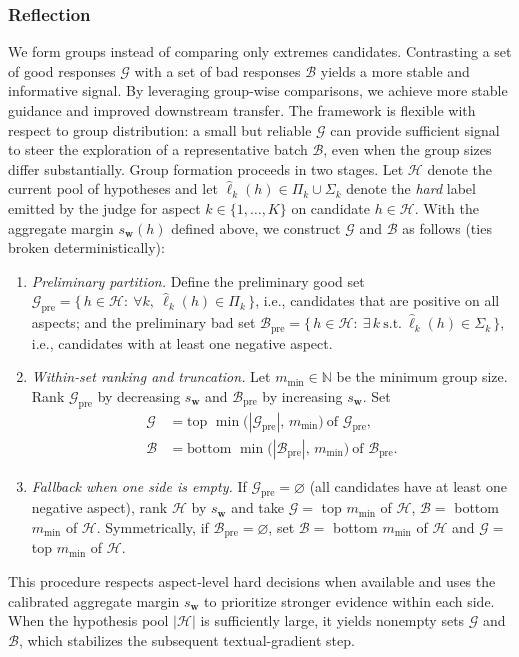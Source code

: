 \documentclass[11pt]{article}
\theoremstyle{plain}
\theoremstyle{definition}
\theoremstyle{remark}
\begin{document}
\subsubsection{Reflection}
We form groups instead of comparing only extremes candidates. Contrasting a set of good responses \(\mathcal{G}\) with a set of bad responses \(\mathcal{B}\) yields a more stable and informative signal. By leveraging group-wise comparisons, we achieve more stable guidance and improved downstream transfer. The framework is flexible with respect to group distribution: a small but reliable $\mathcal{G}$ can provide sufficient signal to steer the exploration of a representative batch $\mathcal{B}$, even when the group sizes differ substantially.
%
Group formation proceeds in two stages. Let \(\mathcal{H}\) denote the current pool of hypotheses and let \(\hat\ell_k(h)\in \Pi_k\cup\Sigma_k\) denote the \emph{hard} label emitted by the judge for aspect \(k\in\{1,\dots,K\}\) on candidate \(h\in\mathcal{H}\). With the aggregate margin \(s_{\mathbf w}(h)\) defined above, we construct \(\mathcal{G}\) and \(\mathcal{B}\) as follows (ties broken deterministically):
\begin{enumerate}
  \item \emph{Preliminary partition.} Define the preliminary good set
  \(\mathcal{G}_{\text{pre}}=\{\,h\in\mathcal{H}:\ \forall k,\ \hat\ell_k(h)\in \Pi_k\,\}\),
  i.e., candidates that are positive on all aspects; and the preliminary bad set
  \(\mathcal{B}_{\text{pre}}=\{\,h\in\mathcal{H}:\ \exists\,k\ \text{s.t.}\ \hat\ell_k(h)\in \Sigma_k\,\}\),
  i.e., candidates with at least one negative aspect.
  \item \emph{Within‑set ranking and truncation.} Let \(m_{\min}\in\mathbb{N}\) be the minimum group size. Rank \(\mathcal{G}_{\text{pre}}\) by decreasing \(s_{\mathbf w}\) and \(\mathcal{B}_{\text{pre}}\) by increasing \(s_{\mathbf w}\). Set
  \[
  \begin{aligned}
    \mathcal{G} &= \text{top }\min\!\bigl(|\mathcal{G}_{\text{pre}}|,\,m_{\min}\bigr)\ \text{of }\mathcal{G}_{\text{pre}},\\
    \mathcal{B} &= \text{bottom }\min\!\bigl(|\mathcal{B}_{\text{pre}}|,\,m_{\min}\bigr)\ \text{of }\mathcal{B}_{\text{pre}}.
  \end{aligned}
  \]
  \item \emph{Fallback when one side is empty.} If \(\mathcal{G}_{\text{pre}}=\varnothing\) (all candidates have at least one negative aspect), rank \(\mathcal{H}\) by \(s_{\mathbf w}\) and take
  \(\mathcal{G}=\) top \(m_{\min}\) of \(\mathcal{H}\), \(\mathcal{B}=\) bottom \(m_{\min}\) of \(\mathcal{H}\).
  Symmetrically, if \(\mathcal{B}_{\text{pre}}=\varnothing\), set \(\mathcal{B}=\) bottom \(m_{\min}\) of \(\mathcal{H}\) and \(\mathcal{G}=\) top \(m_{\min}\) of \(\mathcal{H}\).
\end{enumerate}
This procedure respects aspect‑level hard decisions when available and uses the calibrated aggregate margin \(s_{\mathbf w}\) to prioritize stronger evidence within each side. When the hypothesis pool $|\mathcal{H}|$ is sufficiently large, it yields nonempty sets $\mathcal{G}$ and $\mathcal{B}$, which stabilizes the subsequent textual-gradient step.
\end{document}
